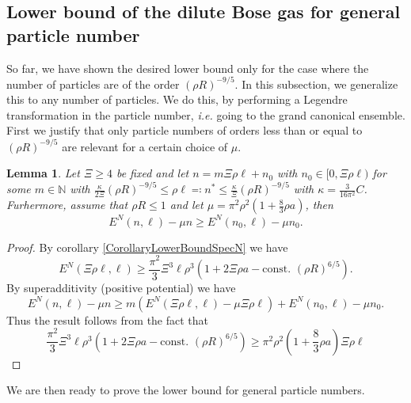 \documentclass[a4paper,11pt]{article}
\newcommand{\ie}{\emph{i.e.} }
\newtheorem{lemma}[theorem]{Lemma}
\numberwithin{equation}{section}
\begin{document}
	\subsection{Lower bound of the dilute Bose gas for general particle number}
	So far, we have shown the desired lower bound only for the case where the number of particles are of the order $ (\rho R)^{-9/5} $. In this subsection, we generalize this to any number of particles. We do this, by performing a Legendre transformation in the particle number, \ie going to the grand canonical ensemble. First we justify that only particle numbers of orders less than or equal to $ (\rho R)^{-9/5} $ are relevant for a certain choice of $ \mu $.
		\begin{lemma}\label{LemmaLocalizationFbound}
			Let $ \Xi\geq 4 $ be fixed and let $ n=m\Xi \rho \ell+n_0 $ with $ n_0\in[0,\Xi\rho \ell) $ for some $ m\in\mathbb{N} $ with $\frac{\kappa}{2\Xi} (\rho R)^{-9/5} \leq \rho\ell\eqqcolon n^{\ast}\leq \frac{\kappa}{\Xi} (\rho R)^{-9/5} $ with $ \kappa=\frac{3}{16\pi^2}C $. Furhermore, assume that $ \rho R\leq  1 $ and let $ \mu=\pi^2\rho^2\left(1+\frac{8}{3}\rho a\right) $, then \begin{equation}
			E^{N}(n,\ell)-\mu n \geq E^{N}(n_0,\ell)-\mu n_0.
			\end{equation}
		\end{lemma}
		\begin{proof}
			By corollary \ref{CorollaryLowerBoundSpecN} we have \begin{equation}
			E^{N}(\Xi\rho\ell,\ell)\geq\frac{\pi^2}{3}\Xi^3\ell\rho^3\left(1+2\Xi\rho a-\text{const. }(\rho R)^{6/5}\right).
			\end{equation}
			By superadditivity (positive potential) we have \begin{equation}
			E^N(n,\ell)-\mu n\geq m\left(E^N(\Xi\rho\ell,\ell)-\mu\Xi\rho\ell \right)+E^N(n_0,\ell)-\mu n_0.
			\end{equation}
			Thus the result follows from the fact that \begin{equation}
			\frac{\pi^2}{3}\Xi^3\ell\rho^3\left(1+2\Xi\rho a-\text{const. }(\rho R)^{6/5}\right)\geq \pi^2\rho^2\left(1+\frac{8}{3}\rho a\right) \Xi\rho\ell
			\end{equation}
		\end{proof}
	We are then ready to prove the lower bound for general particle numbers.
\end{document}
